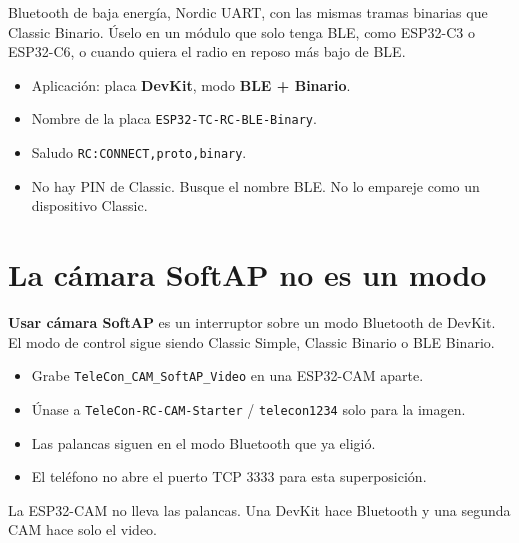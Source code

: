 \documentclass[12pt,a4paper]{article}
\newcommand{\code}[1]{\nolinkurl{#1}}
\newcommand{\ui}[1]{\textsf{\textbf{#1}}}
\begin{document}
Bluetooth de baja energía, Nordic UART, con las mismas tramas binarias que
Classic Binario. Úselo en un módulo que solo tenga BLE, como ESP32-C3 o
ESP32-C6, o cuando quiera el radio en reposo más bajo de BLE.

\begin{itemize}[leftmargin=1.4cm]
  \item Aplicación: placa \ui{DevKit}, modo \ui{BLE + Binario}.
  \item Nombre de la placa \code{ESP32-TC-RC-BLE-Binary}.
  \item Saludo \code{RC:CONNECT,proto,binary}.
  \item No hay PIN de Classic. Busque el nombre BLE. No lo empareje como
        un dispositivo Classic.
\end{itemize}

\section{La cámara SoftAP no es un modo}

\ui{Usar cámara SoftAP} es un interruptor sobre un modo Bluetooth de
DevKit. El modo de control sigue siendo Classic Simple, Classic Binario o
BLE Binario.

\begin{itemize}[leftmargin=1.4cm]
  \item Grabe \code{TeleCon_CAM_SoftAP_Video} en una ESP32-CAM aparte.
  \item Únase a \code{TeleCon-RC-CAM-Starter} / \code{telecon1234} solo
        para la imagen.
  \item Las palancas siguen en el modo Bluetooth que ya eligió.
  \item El teléfono no abre el puerto TCP 3333 para esta superposición.
\end{itemize}

La ESP32-CAM no lleva las palancas. Una DevKit hace Bluetooth y una
segunda CAM hace solo el video.
\end{document}
